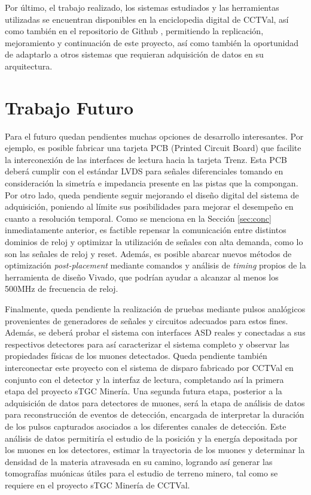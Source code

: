 Por último, el trabajo realizado, los sistemas estudiados y las herramientas utilizadas se encuentran disponibles en la enciclopedia digital de CCTVal, así como también en el repositorio de Github \cite{GonzalezMuonRepository} , permitiendo la replicación, mejoramiento y continuación de este proyecto, así como también la oportunidad de adaptarlo a otros sistemas que requieran adquisición de datos en su arquitectura.


\section{Trabajo Futuro}

Para el futuro quedan pendientes muchas opciones de desarrollo interesantes. Por ejemplo, es posible fabricar una tarjeta PCB (Printed Circuit Board) que facilite la interconexión de las interfaces de lectura hacia la tarjeta Trenz. Esta PCB deberá cumplir con el estándar LVDS para señales diferenciales tomando en consideración la simetría e impedancia presente en las pistas que la compongan. Por otro lado, queda pendiente seguir mejorando el diseño digital del sistema de adquisición, poniendo al límite sus posibilidades para mejorar el desempeño en cuanto a resolución temporal. Como se menciona en la Sección \ref{sec:conc} inmediatamente anterior, es factible repensar la comunicación entre distintos dominios de reloj y optimizar la utilización de señales con alta demanda, como lo son las señales de reloj y reset. Además, es posible abarcar nuevos métodos de optimización \textit{post-placement} mediante comandos y análisis de \textit{timing}\cite{XilinxUltraFastGuide} propios de la herramienta de diseño Vivado, que podrían ayudar a alcanzar al menos los 500MHz de frecuencia de reloj.

Finalmente, queda pendiente la realización de pruebas mediante pulsos analógicos provenientes de generadores de señales y circuitos adecuados para estos fines. Además, se deberá probar el sistema con interfaces ASD reales y conectadas a sus respectivos detectores para así caracterizar el sistema completo y observar las propiedades físicas de los muones detectados. Queda pendiente también interconectar este proyecto con el sistema de disparo\cite{Oyanadel2020SistemaSTGC} fabricado por CCTVal en conjunto con el detector y la interfaz de lectura, completando así la primera etapa del proyecto sTGC Minería. Una segunda futura etapa, posterior a la adquisición de datos para detectores de muones, será la etapa de análisis de datos para reconstrucción de eventos de detección, encargada de interpretar la duración de los pulsos capturados asociados a los diferentes canales de detección. Este análisis de datos permitiría el estudio de la posición y la energía depositada por los muones en los detectores, estimar la trayectoria de los muones y determinar la densidad de la materia atravesada en su camino, logrando así generar las tomografías muónicas útiles para el estudio de terreno minero, tal como se requiere en el proyecto sTGC Minería de CCTVal.
